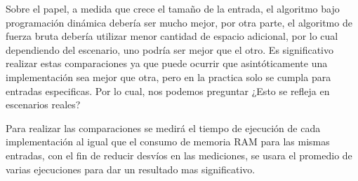 Sobre el papel, a medida que crece el tamaño de la entrada, el algoritmo bajo programación
dinámica debería ser mucho mejor, por otra parte, el algoritmo de fuerza bruta debería
utilizar menor cantidad de espacio adicional, por lo cual dependiendo del escenario, uno
podría ser mejor que el otro. Es significativo 
realizar estas comparaciones ya que puede ocurrir 
que asintóticamente una implementación sea mejor que otra,
pero en la practica solo se cumpla para entradas especificas.
Por lo cual, nos podemos preguntar ¿Esto se refleja en escenarios reales?


Para realizar las comparaciones
se medirá el tiempo de ejecución de cada implementación
al igual que el consumo de memoria RAM para las mismas entradas, con 
el fin de reducir desvíos en las mediciones, se usara el promedio
de varias ejecuciones para dar un resultado mas significativo.
